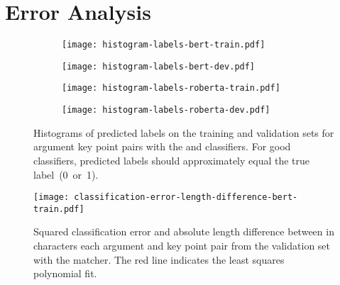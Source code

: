 \section{Error Analysis}\label{error-analysis}
\begin{figure*}
    \centering
    \begin{subfigure}{0.49\linewidth}
        \vspace*{-1ex}
        \centering
        \texttt{[image: histogram-labels-bert-train.pdf]}
        \vspace*{-3ex}
        \label{subfig:bert_train}
    \end{subfigure}
    \hfill
    \begin{subfigure}{0.49\linewidth}
        \vspace*{-1ex}
        \centering
        \texttt{[image: histogram-labels-bert-dev.pdf]}
        \vspace*{-3ex}
        \label{subfig:bert_dev}
    \end{subfigure}
    \begin{subfigure}{0.49\linewidth}
        \vspace*{-1ex}
        \centering
        \texttt{[image: histogram-labels-roberta-train.pdf]}
        \vspace*{-3ex}
        \label{subfig:roberta_train}
    \end{subfigure}
    \hfill
    \begin{subfigure}{0.49\linewidth}
        \vspace*{-1ex}
        \centering
        \texttt{[image: histogram-labels-roberta-dev.pdf]}
        \vspace*{-3ex}
        \label{subfig:roberta_dev}
    \end{subfigure}
    \caption{Histograms of predicted labels on the training and validation sets for argument key point pairs with the \BertBase and \RobertaBase classifiers. For good classifiers, predicted labels should approximately equal the true label~(0~or~1).}
    \label{fig:frequency}
\end{figure*}

\begin{figure}
    \texttt{[image: classification-error-length-difference-bert-train.pdf]}
    \vspace*{-5ex}
    \caption{Squared classification error and absolute length difference between in characters each argument and key point pair from the validation set with the \BertBase matcher. The red line indicates the least squares polynomial fit.}
    \label{classification-error-length}
\end{figure}

